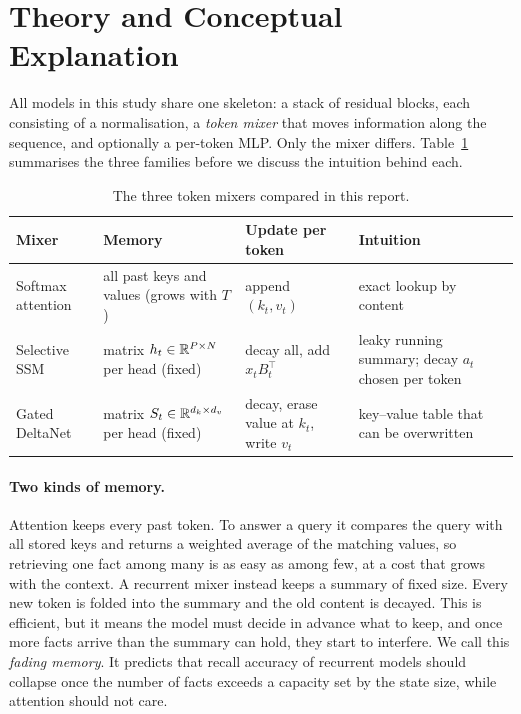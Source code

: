 \section{Theory and Conceptual Explanation}
\label{sec:theory}

All models in this study share one skeleton: a stack of residual blocks, each consisting of a normalisation,
a \emph{token mixer} that moves information along the sequence, and optionally a per-token MLP. Only the
mixer differs. Table~\ref{tab:mixers} summarises the three families before we discuss the intuition behind
each.

\begin{table}[htbp]\centering\small
\begin{tabular}{p{2.6cm}p{3.6cm}p{3.4cm}p{4.6cm}}\toprule
Mixer & Memory & Update per token & Intuition \\\midrule
Softmax attention & all past keys and values (grows with $T$) & append $(k_t, v_t)$ & exact lookup by content
\\[2pt]
Selective SSM & matrix $h_t\in\mathbb{R}^{P\times N}$ per head (fixed) & decay all, add $x_t B_t^\top$ &
leaky running summary; decay $a_t$ chosen per token \\[2pt]
Gated DeltaNet & matrix $S_t\in\mathbb{R}^{d_k\times d_v}$ per head (fixed) & decay, erase value at $k_t$, write
$v_t$ & key--value table that can be overwritten \\\bottomrule
\end{tabular}
\caption{The three token mixers compared in this report.}
\label{tab:mixers}
\end{table}

\paragraph{Two kinds of memory.} Attention keeps every past token. To answer a query it compares the query
with all stored keys and returns a weighted average of the matching values, so retrieving one fact among
many is as easy as among few, at a cost that grows with the context. A recurrent mixer instead keeps a
summary of fixed size. Every new token is folded into the summary and the old content is decayed. This is
efficient, but it means the model must decide in advance what to keep, and once more facts arrive than the
summary can hold, they start to interfere. We call this \emph{fading memory}. It predicts that recall
accuracy of recurrent models should collapse once the number of facts exceeds a capacity set by the state
size, while attention should not care.

